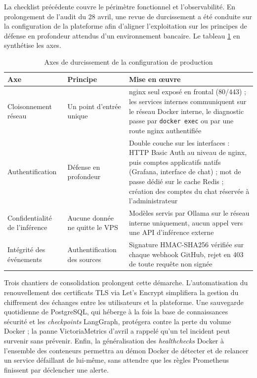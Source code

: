         La checklist précédente couvre le périmètre fonctionnel et l'observabilité. En
        prolongement de l'audit du 28 avril, une revue de durcissement a été conduite
        sur la configuration de la plateforme afin d'aligner l'exploitation sur les
        principes de défense en profondeur attendus d'un environnement bancaire. Le
        tableau \ref{tab:hardening_gaps} en synthétise les axes.

        \begin{table}[H]
        \centering
        \begin{tabular}{|m{3.4cm}|m{4cm}|m{5.2cm}|}
        \hline
        \textbf{Axe} & \textbf{Principe} & \textbf{Mise en œuvre} \\
        \hline
        Cloisonnement réseau & Un point d'entrée unique & nginx seul exposé en frontal (80/443) ; les services internes communiquent sur le réseau Docker interne, le diagnostic passe par \texttt{docker exec} ou par une route nginx authentifiée \\
        \hline
        Authentification & Défense en profondeur & Double couche sur les interfaces : HTTP Basic Auth au niveau de nginx, puis comptes applicatifs natifs (Grafana, interface de chat) ; mot de passe dédié sur le cache Redis ; création des comptes du chat réservée à l'administrateur \\
        \hline
        Confidentialité de l'inférence & Aucune donnée ne quitte le VPS & Modèles servis par Ollama sur le réseau interne uniquement, aucun appel vers une API d'inférence externe \\
        \hline
        Intégrité des événements & Authentification des sources & Signature HMAC-SHA256 vérifiée sur chaque webhook GitHub, rejet en 403 de toute requête non signée \\
        \hline
        \end{tabular}
        \caption{Axes de durcissement de la configuration de production}
        \label{tab:hardening_gaps}
        \end{table}

        Trois chantiers de consolidation prolongent cette démarche. L'automatisation
        du renouvellement des certificats TLS via Let's Encrypt simplifiera la
        gestion du chiffrement des échanges entre les utilisateurs et la plateforme.
        Une sauvegarde quotidienne de PostgreSQL, qui héberge à la fois la base de
        connaissances sécurité et les \textit{checkpoints} LangGraph, protégera contre
        la perte du volume Docker ; la panne VictoriaMetrics d'avril a rappelé qu'un
        tel incident peut survenir sans prévenir. Enfin, la généralisation des
        \textit{healthchecks} Docker à l'ensemble des conteneurs permettra au démon
        Docker de détecter et de relancer un service défaillant de lui-même, sans
        attendre que les règles Prometheus finissent par déclencher une alerte.

